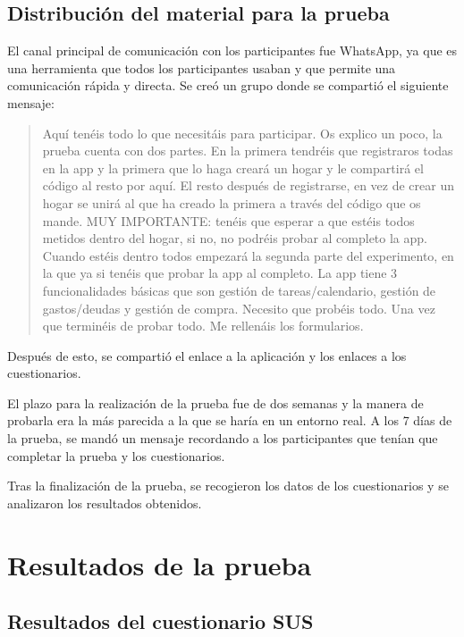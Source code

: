 \subsection{Distribución del material para la prueba}

El canal principal de comunicación con los participantes fue WhatsApp, ya que es una 
herramienta que todos los participantes usaban y que permite una comunicación rápida y directa.
Se creó un grupo donde se compartió el siguiente mensaje: 

\begin{quote}
    Aquí tenéis todo lo que necesitáis para participar. Os explico un poco, la prueba cuenta con dos partes. 
    En la primera tendréis que registraros todas en la app y la primera que lo haga creará un hogar y le compartirá el código al resto por aquí. 
    El resto después de registrarse, en vez de crear un hogar se unirá al que ha creado la primera a través del código que os mande. 
    MUY IMPORTANTE: tenéis que esperar a que estéis todos metidos dentro del hogar, si no, no podréis probar al completo la app. 
    Cuando estéis dentro todos empezará la segunda parte del experimento, en la que ya si tenéis que probar la app al completo. 
    La app tiene 3 funcionalidades básicas que son gestión de tareas/calendario, gestión de gastos/deudas y gestión de compra. 
    Necesito que probéis todo. Una vez que terminéis de probar todo. Me rellenáis los formularios.

\end{quote}

Después de esto, se compartió el enlace a la aplicación y los enlaces a los cuestionarios.

El plazo para la realización de la prueba fue de dos semanas y la manera de probarla 
era la más parecida a la que se haría en un entorno real. A los 7 días de la prueba, se mandó un mensaje recordando a los participantes que tenían que completar la prueba y los cuestionarios.

Tras la finalización de la prueba, se recogieron los datos de los cuestionarios y se analizaron los resultados obtenidos.


\section{Resultados de la prueba}


\subsection{Resultados del cuestionario SUS}

